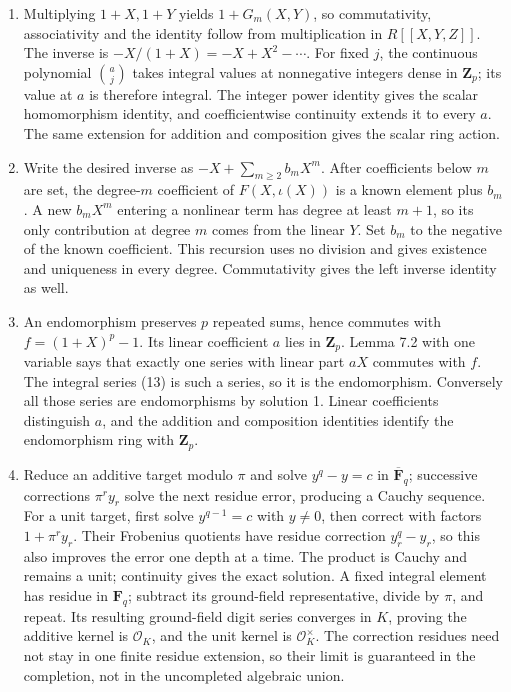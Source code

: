 \documentclass[11pt,a4paper]{article}
\newcommand{\tightlist}{\setlength{\itemsep}{0pt}\setlength{\parskip}{0pt}}
\begin{document}
\begin{enumerate}
\def\labelenumi{\arabic{enumi}.}
\tightlist
\item
  Multiplying \(1+X,1+Y\) yields \(1+G_m(X,Y)\), so commutativity,
  associativity and the identity follow from multiplication in
  \(R[[X,Y,Z]]\). The inverse is \(-X/(1+X)=-X+X^2-\cdots\). For fixed
  \(j\), the continuous polynomial \(\binom aj\) takes integral values
  at nonnegative integers dense in \(\mathbf Z_p\); its value at \(a\)
  is therefore integral. The integer power identity gives the scalar
  homomorphism identity, and coefficientwise continuity extends it to
  every \(a\). The same extension for addition and composition gives the
  scalar ring action.
\item
  Write the desired inverse as \(-X+\sum_{m\geq2}b_mX^m\). After
  coefficients below \(m\) are set, the degree-\(m\) coefficient of
  \(F(X,\iota(X))\) is a known element plus \(b_m\). A new \(b_mX^m\)
  entering a nonlinear term has degree at least \(m+1\), so its only
  contribution at degree \(m\) comes from the linear \(Y\). Set \(b_m\)
  to the negative of the known coefficient. This recursion uses no
  division and gives existence and uniqueness in every degree.
  Commutativity gives the left inverse identity as well.
\item
  An endomorphism preserves \(p\) repeated sums, hence commutes with
  \(f=(1+X)^p-1\). Its linear coefficient \(a\) lies in \(\mathbf Z_p\).
  Lemma 7.2 with one variable says that exactly one series with linear
  part \(aX\) commutes with \(f\). The integral series (13) is such a
  series, so it is the endomorphism. Conversely all those series are
  endomorphisms by solution 1. Linear coefficients distinguish \(a\),
  and the addition and composition identities identify the endomorphism
  ring with \(\mathbf Z_p\).
\item
  Reduce an additive target modulo \(\pi\) and solve \(y^q-y=c\) in
  \(\overline{\mathbf F}_q\); successive corrections \(\pi^r y_r\) solve
  the next residue error, producing a Cauchy sequence. For a unit
  target, first solve \(y^{q-1}=c\) with \(y\ne0\), then correct with
  factors \(1+\pi^r y_r\). Their Frobenius quotients have residue
  correction \(y_r^q-y_r\), so this also improves the error one depth at
  a time. The product is Cauchy and remains a unit; continuity gives the
  exact solution. A fixed integral element has residue in
  \(\mathbf F_q\); subtract its ground-field representative, divide by
  \(\pi\), and repeat. Its resulting ground-field digit series converges
  in \(K\), proving the additive kernel is \(\mathcal O_K\), and the
  unit kernel is \(\mathcal O_K^\times\). The correction residues need
  not stay in one finite residue extension, so their limit is guaranteed
  in the completion, not in the uncompleted algebraic union.
\end{enumerate}
\end{document}
